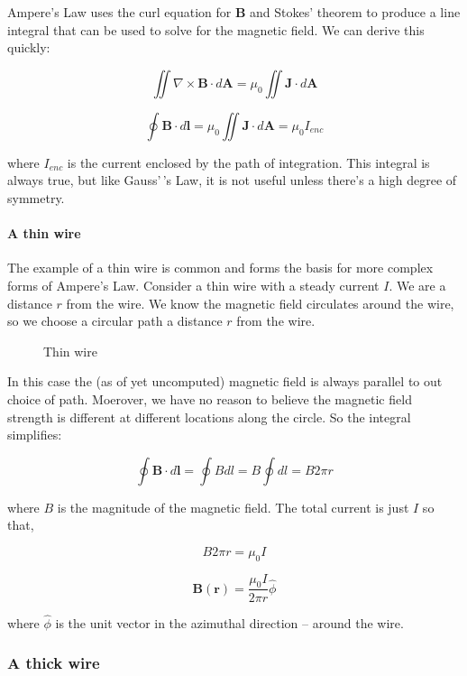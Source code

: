 Ampere's Law uses the curl equation for \(\mathbf{B}\) and Stokes'
theorem to produce a line integral that can be used to solve for the
magnetic field. We can derive this quickly:

\[\iint \nabla \times \mathbf{B} \cdot d\mathbf{A} = \mu_0 \iint \mathbf{J} \cdot d\mathbf{A}\]

\[\oint \mathbf{B} \cdot d\mathbf{l} = \mu_0 \iint \mathbf{J} \cdot d\mathbf{A} = \mu_0 I_{enc}\]

where \(I_{enc}\) is the current enclosed by the path of integration.
This integral is always true, but like Gauss'\,'s Law, it is not useful
unless there's a high degree of symmetry.

\paragraph{A thin wire}\label{a-thin-wire}

The example of a thin wire is common and forms the basis for more
complex forms of Ampere's Law. Consider a thin wire with a steady
current \(I\). We are a distance \(r\) from the wire. We know the
magnetic field circulates around the wire, so we choose a circular path
a distance \(r\) from the wire.

\begin{figure}
\centering
{}
\caption{Thin wire}
\end{figure}

In this case the (as of yet uncomputed) magnetic field is always
parallel to out choice of path. Moerover, we have no reason to believe
the magnetic field strength is different at different locations along
the circle. So the integral simplifies:

\[\oint \mathbf{B} \cdot d\mathbf{l} = \oint B dl = B \oint dl = B 2\pi r\]

where \(B\) is the magnitude of the magnetic field. The total current is
just \(I\) so that,

\[B 2\pi r = \mu_0 I\]

\[\mathbf{B}({\mathbf{r}}) = \frac{\mu_0 I}{2\pi r}\hat{\phi}\]

where \(\hat{\phi}\) is the unit vector in the azimuthal direction --
around the wire.

\subsubsection{A thick wire}\label{a-thick-wire}

